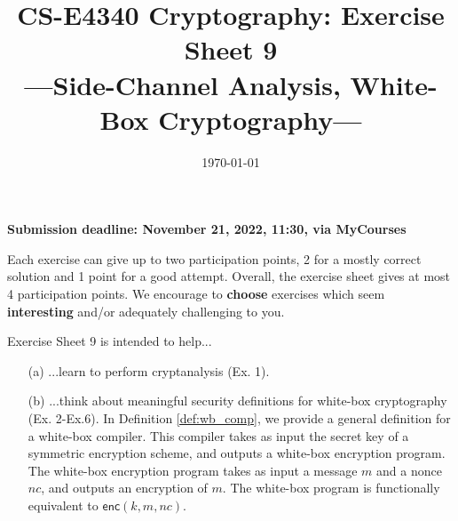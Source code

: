 \documentclass[envcountsame,runningheads,notitlepage]{../llncs}
\title{CS-E4340 Cryptography: Exercise Sheet 9\\
\large ---Side-Channel Analysis, White-Box Cryptography---}
\author{}\institute{}
\date{\today}
\theoremstyle{definition}
\renewcommand{\O}[1]{\ensuremath{\mathsf{#1}}}
\renewcommand{\O}[1]{\ensuremath{\mathsf{#1}}}
\newcommand{\StyleModel}[1]{\O{{#1}}}
\renewcommand{\enc}{\StyleModel{enc}}
\begin{document}
\maketitle

\textbf{Submission deadline: November 21, 2022, 11:30, via MyCourses}

Each exercise can give up to two participation points, 2 for a mostly correct solution and 1 point for a good attempt. Overall, the exercise sheet gives at most 4 participation points. We encourage to \textbf{choose} exercises which seem \textbf{interesting} and/or adequately challenging to you.

\medskip
\noindent
Exercise Sheet 9 is intended to help...
\begin{itemize}
\item[(a)] ...learn to perform cryptanalysis (Ex. 1).
\item[(b)] ...think about meaningful security definitions for white-box cryptography (Ex. 2-Ex.6). In  Definition \ref{def:wb_comp}, we provide a general definition for a white-box compiler. This compiler takes as input the secret key of a symmetric encryption scheme, and outputs a white-box encryption program. The white-box encryption program takes as input a message $m$ and a nonce $nc$, and outputs an encryption of $m$. The white-box program is functionally equivalent to $\enc(k,m,nc)$.
\end{itemize}
\end{document}
